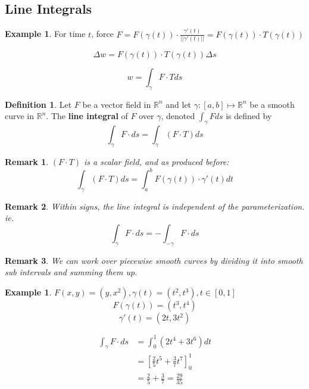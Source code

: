 \documentclass[12pt]{article}
\theoremstyle{plain}
\newtheorem*{remark}{Remark}
\theoremstyle{definition}
\newtheorem{definition}[theorem]{Definition}
\newtheorem{example}[theorem]{Example}
\begin{document}
\subsection{Line Integrals}

\begin{example}
	For time $t$, force $F = F(\gamma(t)) \cdot \frac{\gamma ' (t)}{||\gamma ' (t)||} = F(\gamma (t)) \cdot T (\gamma (t))$
	
	$$\Delta w = F(\gamma(t)) \cdot T (\gamma (t)) \Delta s$$
	
	$$w= \int_\gamma F \cdot T ds$$
	
\end{example}

\begin{definition}
	Let $F$ be a vector field in $\mathbb{R}^n$ and let $\gamma : [a,b] \mapsto \mathbb{R}^n$ be a smooth curve in $\mathbb{R}^n$. The \textbf{line integral} of $F$ over $\gamma$, denoted $\int_\gamma F ds$ is defined by
	$$\int_\gamma F \cdot ds = \int_\gamma ( F \cdot T) ds$$
\end{definition}

\begin{remark}
	$(F \cdot T)$ is a scalar field, and as produced before:
	$$\int_\gamma ( F \cdot T) ds = \int_a^b F(\gamma(t)) \cdot \gamma ' (t) dt$$
\end{remark}

\begin{remark}
	Within signs, the line integral is independent of the parameterization. ie.
	$$\int_\gamma F \cdot ds = - \int_{-\gamma} F \cdot ds$$
\end{remark}

\begin{remark}
	We can work over piecewise smooth curves by dividing it into smooth sub intervals and summing them up.
\end{remark}

\begin{example}
	$F(x,y) = (y,x^2), \gamma (t) = (t^2, t^3), t\in[0,1]$
	$$F(\gamma (t)) = (t^3, t^4)$$
	$$\gamma ' (t) = (2t, 3t^2)$$
	
	\begin{align*}
		\int_\gamma F \cdot ds &= \int_0^1 (2t^4 + 3t^6) dt\\
		&= [\frac{2}{5} t^5 + \frac{3}{7} t^7]^1_0\\
		&= \frac{2}{5}+ \frac{3}{7} = \frac{29}{35}
	\end{align*}

\end{example}
\end{document}
